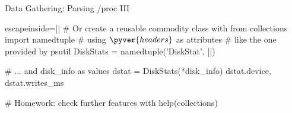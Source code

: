 \begin{pyframe}{Data Gathering: Parsing /proc III}
\begin{pycode*}{escapeinside=||}
# Or create a reusable commodity class with
from collections import namedtuple
# using $\pyver{headers}$ as attributes
#  like the one provided by psutil
DiskStats = namedtuple('DiskStat', ||)

# ... and disk_info as values
dstat = DiskStats(*disk_info)
dstat.device, dstat.writes_ms

# Homework: check further features with
help(collections)
\end{pycode*}
\end{pyframe}


\iffalse
\begin{pyframe}{Data Gathering: subprocess}
\begin{pycode}
# foo
\end{pycode}
\end{pyframe}

\fi
